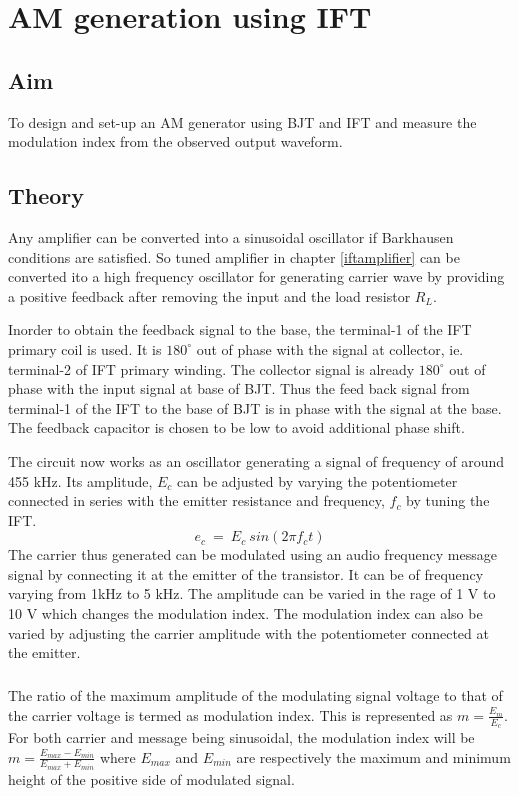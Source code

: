 \chapter[AM generation using IFT]{AM generation using IFT}

\section*{Aim}
To design and set-up  an AM generator using BJT and IFT and measure the modulation index from the observed output waveform.

\section*{Theory}
Any amplifier can be converted into a sinusoidal oscillator if Barkhausen conditions are satisfied. So tuned amplifier in chapter \ref{iftamplifier} can be converted ito a high frequency oscillator for generating carrier wave by providing a positive feedback after removing  the input and the load resistor $R_L$.

Inorder to obtain the feedback signal to the base, the terminal-1 of the IFT primary coil is used. It is $180^{\circ}$ out of phase with the signal at collector, ie. terminal-2 of IFT primary winding. The collector signal is already $180^{\circ}$ out of phase with the input signal at base of BJT. Thus the feed back signal from terminal-1 of the IFT to the base of BJT is in phase with the signal at the base. The feedback capacitor is chosen to be low to avoid additional phase shift.  

The circuit now works as an oscillator generating a signal of frequency of around 455 kHz. Its amplitude, $E_c$ can be adjusted by varying the potentiometer connected in series with the emitter resistance and frequency, $f_c$ by tuning the IFT.
\begin{equation}
e_c\ =\ E_c\ sin(2\pi f_ct)
\end{equation}
The carrier thus generated can be modulated using an audio frequency message signal by connecting it at the emitter of the transistor. It can be of frequency varying from 1kHz to 5 kHz. The amplitude can be varied in the rage of 1 V to 10 V which changes the modulation index. The modulation index can also be varied by adjusting the carrier amplitude with the potentiometer connected at the emitter.


\paragraph{}
The ratio of the maximum amplitude of the modulating signal voltage to that of the carrier voltage is termed as modulation index. This is represented as $m=\frac{E_m}{E_c}$. For both carrier and message being sinusoidal, the modulation index will be 
$m=\frac{E_{max}-E_{min}}{E_{max}+E_{min}}$
\noindent where $E_{max}$ and $E_{min}$ are respectively the maximum and minimum height of the positive side of modulated signal.
